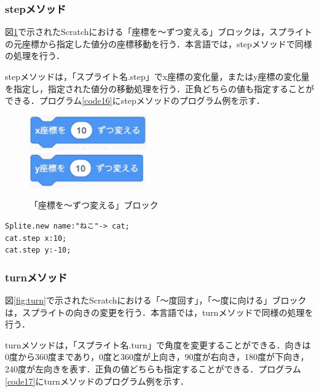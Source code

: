 \documentclass[10pt,a4j]{ltjsarticle}
\begin{document}
\subsubsection{stepメソッド}
図\ref{fig:step}で示されたScratchにおける「座標を〜ずつ変える」ブロックは，スプライトの元座標から指定した値分の座標移動を行う．本言語では，stepメソッドで同様の処理を行う．

stepメソッドは，「スプライト名.step」でx座標の変化量，またはy座標の変化量を指定し，指定された値分の移動処理を行う．正負どちらの値も指定することができる．プログラム\ref{code16}にstepメソッドのプログラム例を示す．

\begin{figure}[H]
  \centering
  \includegraphics[height=15mm]{images/step_x.pdf} \\
  \includegraphics[height=15mm]{images/step_y.pdf} 
  \caption{「座標を〜ずつ変える」ブロック}
  \label{fig:step}
\end{figure}

\begin{lstlisting}[caption=stepメソッドのプログラム例, label=code16]
Splite.new name:"ねこ"-> cat;
cat.step x:10; 
cat.step y:-10; 
\end{lstlisting}

\subsubsection{turnメソッド}
図\ref{fig:turn}で示されたScratchにおける「〜度回す」，「〜度に向ける」ブロックは，スプライトの向きの変更を行う．本言語では，turnメソッドで同様の処理を行う．

turnメソッドは，「スプライト名.turn」で角度を変更することができる．向きは0度から360度まであり，0度と360度が上向き，90度が右向き，180度が下向き，240度が左向きを表す．正負の値どちらも指定することができる．プログラム\ref{code17}にturnメソッドのプログラム例を示す．
\end{document}

